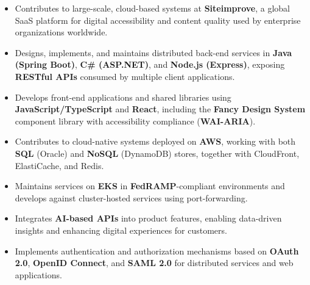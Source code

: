 \documentclass[10pt,a4paper,ragged2e]{altacv}
\begin{document}
\begin{itemize}
	\item Contributes to large-scale, cloud-based systems at \textbf{Siteimprove}, a global SaaS platform for digital accessibility and content quality used by enterprise organizations worldwide.
	\item Designs, implements, and maintains distributed back-end services in \textbf{Java (Spring Boot)}, \textbf{C\# (ASP.NET)}, and \textbf{Node.js (Express)}, exposing \textbf{RESTful APIs} consumed by multiple client applications.
	\item Develops front-end applications and shared libraries using \textbf{JavaScript/TypeScript} and \textbf{React}, including the \textbf{Fancy Design System} component library with accessibility compliance (\textbf{WAI-ARIA}).
	\item Contributes to cloud-native systems deployed on \textbf{AWS}, working with both \textbf{SQL} (Oracle) and \textbf{NoSQL} (DynamoDB) stores, together with CloudFront, ElastiCache, and Redis.
	\item Maintains services on \textbf{EKS} in \textbf{FedRAMP}-compliant environments and develops against cluster-hosted services using port-forwarding.
	\item Integrates \textbf{AI-based APIs} into product features, enabling data-driven insights and enhancing digital experiences for customers.
	\item Implements authentication and authorization mechanisms based on \textbf{OAuth 2.0}, \textbf{OpenID Connect}, and \textbf{SAML 2.0} for distributed services and web applications.
\end{itemize}

\divider%
\end{document}
